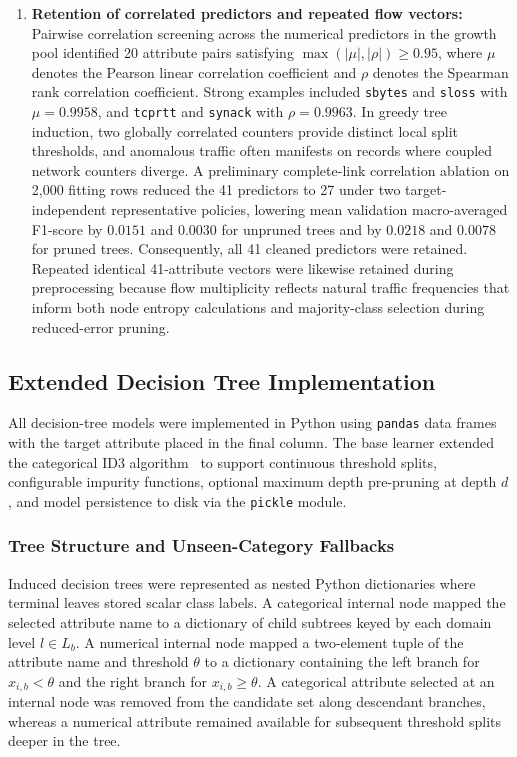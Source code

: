 \begin{enumerate}
    \item \textbf{Retention of correlated predictors and repeated flow vectors:} Pairwise correlation screening across the numerical predictors in the growth pool identified 20 attribute pairs satisfying $\max(|\mu|, |\rho|) \ge 0.95$, where $\mu$ denotes the Pearson linear correlation coefficient and $\rho$ denotes the Spearman rank correlation coefficient. Strong examples included \texttt{sbytes} and \texttt{sloss} with $\mu = 0.9958$, and \texttt{tcprtt} and \texttt{synack} with $\rho = 0.9963$. In greedy tree induction, two globally correlated counters provide distinct local split thresholds, and anomalous traffic often manifests on records where coupled network counters diverge. A preliminary complete-link correlation ablation on 2,000 fitting rows reduced the 41 predictors to 27 under two target-independent representative policies, lowering mean validation macro-averaged F1-score by $0.0151$ and $0.0030$ for unpruned trees and by $0.0218$ and $0.0078$ for pruned trees. Consequently, all 41 cleaned predictors were retained. Repeated identical 41-attribute vectors were likewise retained during preprocessing because flow multiplicity reflects natural traffic frequencies that inform both node entropy calculations and majority-class selection during reduced-error pruning.
\end{enumerate}

\subsection{Extended Decision Tree Implementation}
\label{subsec:meth_tree}
All decision-tree models were implemented in Python using \texttt{pandas} data frames with the target attribute placed in the final column. The base learner extended the categorical ID3 algorithm~\cite{Quinlan1986} to support continuous threshold splits, configurable impurity functions, optional maximum depth pre-pruning at depth $d$, and model persistence to disk via the \texttt{pickle} module.

\subsubsection{Tree Structure and Unseen-Category Fallbacks}
Induced decision trees were represented as nested Python dictionaries where terminal leaves stored scalar class labels. A categorical internal node mapped the selected attribute name to a dictionary of child subtrees keyed by each domain level $l \in L_b$. A numerical internal node mapped a two-element tuple of the attribute name and threshold $\theta$ to a dictionary containing the left branch for $x_{i,b} < \theta$ and the right branch for $x_{i,b} \ge \theta$. A categorical attribute selected at an internal node was removed from the candidate set along descendant branches, whereas a numerical attribute remained available for subsequent threshold splits deeper in the tree.

